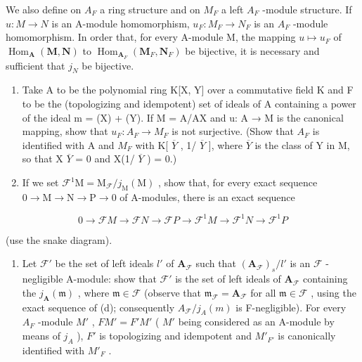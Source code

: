 We also define on \(A_{F}\) a ring structure and on \(M_{F}\) a left \(A_{F}\) -module structure. If \(u: M \to N\) is an A-module homomorphism, \(u_{F}: M_{F} \to N_{F}\) is an \(A_{F}\) -module homomorphism. In order that, for every A-module M, the mapping \(u \mapsto u_{F}\) of \(\operatorname{Hom}_{\mathbf{A}}(\mathbf{M}, \mathbf{N})\) to \(\operatorname{Hom}_{\mathbf{A}_{F}}(\mathbf{M}_{F}, \mathbf{N}_{F})\) be bijective, it is necessary and sufficient that \(j_{N}\) be bijective.

\begin{enumerate}
\def\labelenumi{(\alph{enumi})}
\setcounter{enumi}{5}
\item
  Take A to be the polynomial ring K{[}X, Y{]} over a commutative field K and F to be the (topologizing and idempotent) set of ideals of A containing a power of the ideal m = (X) + (Y). If M = A/AX and u: A → M is the canonical mapping, show that \(u_{F}: A_{F} \to M_{F}\) is not surjective. (Show that \(A_{F}\) is identified with A and \(M_{F}\) with K{[} \(\overline{Y}\) , 1/ \(\overline{Y}\) {]}, where \(\overline{Y}\) is the class of Y in M, so that X \(\overline{Y}\) = 0 and X(1/ \(\overline{Y}\) ) = 0.)
\item
  If we set \(\mathcal{F}^1\mathrm{M} = \mathrm{M}_{\mathcal{F}} / j_{\mathrm{M}}(\mathrm{M})\) , show that, for every exact sequence \(0\to \mathrm{M}\to \mathrm{N}\to \mathrm{P}\to 0\) of A-modules, there is an exact sequence
\end{enumerate}

\[
0 \rightarrow \mathcal {F} M \rightarrow \mathcal {F} N \rightarrow \mathcal {F} P \rightarrow \mathcal {F} ^ {1} M \rightarrow \mathcal {F} ^ {1} N \rightarrow \mathcal {F} ^ {1} P
\]

(use the snake diagram).

\begin{enumerate}
\def\labelenumi{(\alph{enumi})}
\setcounter{enumi}{7}
\tightlist
\item
  Let \(\mathcal{F}'\) be the set of left ideals \(l'\) of \(\mathbf{A}_{\mathcal{F}}\) such that \((\mathbf{A}_{\mathcal{F}})_s / l'\) is an \(\mathcal{F}\) -negligible A-module: show that \(\mathcal{F}'\) is the set of left ideals of \(\mathbf{A}_{\mathcal{F}}\) containing the \(j_{\mathbf{A}}(\mathfrak{m})\) , where \(\mathfrak{m} \in \mathcal{F}\) (observe that \(\mathfrak{m}_{\mathcal{F}} = \mathbf{A}_{\mathcal{F}}\) for all \(\mathfrak{m} \in \mathcal{F}\) , using the exact sequence of (d); consequently \(A_{\mathcal{F}}/j_{A}(m)\) is F-negligible). For every \(A_{F}\) -module \(M'\) , \(FM' = F'M'\) ( \(M'\) being considered as an A-module by means of \(j_{A}\) ), \(F'\) is topologizing and idempotent and \(M'_{F'}\) is canonically identified with \(M'_{F}\) .
\end{enumerate}

